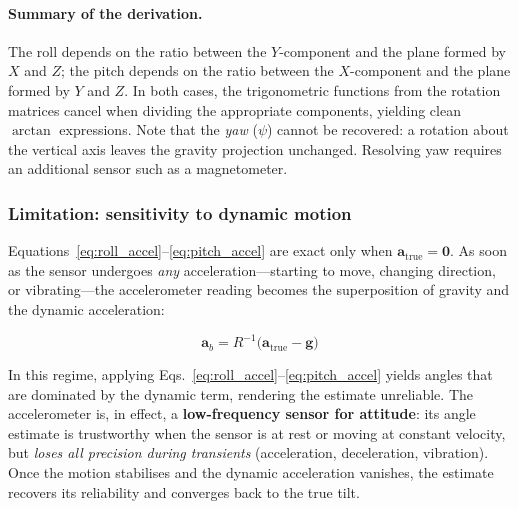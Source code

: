 \paragraph{Summary of the derivation.}
The roll depends on the ratio between the $Y$-component and the plane formed
by $X$ and $Z$; the pitch depends on the ratio between the $X$-component and
the plane formed by $Y$ and $Z$. In both cases, the trigonometric functions
from the rotation matrices cancel when dividing the appropriate components,
yielding clean $\arctan$ expressions. Note that the \emph{yaw} ($\psi$)
cannot be recovered: a rotation about the vertical axis leaves the gravity
projection unchanged. Resolving yaw requires an additional sensor such as a
magnetometer.

\subsubsection{Limitation: sensitivity to dynamic motion}
\label{sec:frames:accel:limitation}

Equations~\eqref{eq:roll_accel}--\eqref{eq:pitch_accel} are exact only when
$\mathbf{a}_\text{true} = \mathbf{0}$. As soon as the sensor undergoes
\emph{any} acceleration---starting to move, changing direction, or
vibrating---the accelerometer reading becomes the superposition of gravity and
the dynamic acceleration:

\begin{equation}
  \mathbf{a}_b = R^{-1}\!\bigl(\mathbf{a}_\text{true} - \mathbf{g}\bigr)
  \label{eq:accel_dynamic}
\end{equation}

\noindent In this regime, applying
Eqs.~\eqref{eq:roll_accel}--\eqref{eq:pitch_accel} yields angles that are
dominated by the dynamic term, rendering the estimate unreliable. The
accelerometer is, in effect, a \textbf{low-frequency sensor for attitude}: its
angle estimate is trustworthy when the sensor is at rest or moving at constant
velocity, but \emph{loses all precision during transients} (acceleration,
deceleration, vibration). Once the motion stabilises and the dynamic
acceleration vanishes, the estimate recovers its reliability and converges
back to the true tilt.

%


